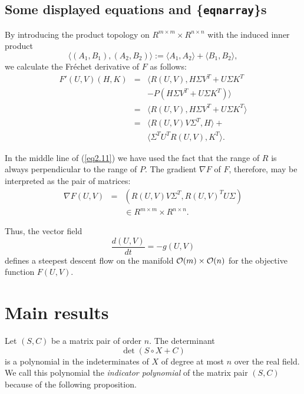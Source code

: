 \documentclass{svk_en}
\begin{document}
\subsection{Some displayed equations and \{{\tt eqnarray}\}s}
     By introducing the product topology on  $R^{m \times m} \times
R^{n \times n}$  with the induced inner product
\begin{equation}
\langle (A_{1},B_{1}), (A_{2},B_{2})\rangle := \langle A_{1},A_{2}\rangle 
+ \langle B_{1},B_{2}\rangle,\label{eq2.10}
\end{equation}
we calculate the Fr\'{e}chet derivative of  $F$  as follows:
\begin{eqnarray}
 F'(U,V)(H,K) &=& \langle R(U,V),H\Sigma V^{T} + U\Sigma K^{T}\nonumber\\
             && - P(H\Sigma V^{T} + U\Sigma K^{T})\rangle \nonumber \\
         &=& \langle R(U,V),H\Sigma V^{T} + U\Sigma K^{T}\rangle\nonumber \\
&=& \langle R(U,V)V\Sigma^{T},H\rangle + \nonumber\\
  &&    \langle \Sigma^{T}U^{T}R(U,V),K^{T}\rangle.    \label{eq2.11}
\end{eqnarray}

In the middle line of (\ref{eq2.11}) we have used the fact that the range of
$R$ is always perpendicular to the range of $P$.  The gradient $\nabla F$  of
$F$, therefore,  may be interpreted as the
pair of matrices:
\begin{eqnarray}
 \nabla F(U,V) &=& (R(U,V)V\Sigma^{T},R(U,V)^{T}U\Sigma )\nonumber\\
 && \in R^{m \times m} \times R^{n \times n}.   \label{eq2.12}
\end{eqnarray}

Thus, the vector field
\begin{equation}
\frac{d(U,V)}{dt} = -g(U,V) 	\label{eq2.15}
\end{equation}
defines a steepest descent flow on the manifold  ${\cal O} (m) \times
{\cal O} (n)$ for the objective function  $F(U,V)$.

 
\section{Main results} 
 
Let $(S,C)$ be a matrix pair of order $n$.  The determinant
\[\det (S\circ X+C)\] 
is a polynomial in the indeterminates of $X$ of degree at
most $n$ over the real field. We call this polynomial the
{\em indicator polynomial} of the matrix pair $(S,C)$
because of the following proposition.
 
\end{document}
